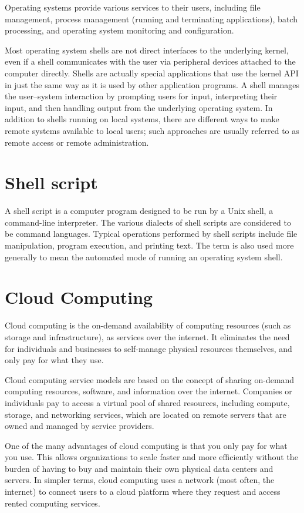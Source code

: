 	Operating systems provide various services to their users, including file management, process management (running and terminating applications), batch processing, and operating system monitoring and configuration.

	Most operating system shells are not direct interfaces to the underlying kernel, even if a shell communicates with the user via peripheral devices 
	attached to the computer directly. Shells are actually special applications that use the kernel API in just the same way as it is used by 
	other application programs. A shell manages the user–system interaction by prompting users for input, interpreting their input, and then 
	handling output from the underlying operating system. In addition to shells running on local systems, there are different ways to make remote 
	systems available to local users; such approaches are usually referred to as remote access or remote administration.

\section{Shell script}
	A shell script \cite{shellscript} is a computer program designed to be run by a Unix shell, a command-line interpreter. The various dialects of shell scripts 
	are considered to be command languages. Typical operations performed by shell scripts include file manipulation, program execution, and printing text.
	The term is also used more generally to mean the automated mode of running an operating system shell.

\section{Cloud Computing}
	Cloud computing \cite{cloud} is the on-demand availability of computing resources (such as storage and infrastructure), as services over the internet. 
	It eliminates the need for individuals and businesses to self-manage physical resources themselves, and only pay for what they use.

	Cloud computing service models are based on the concept of sharing on-demand computing resources, software, and information over the internet. 
	Companies or individuals pay to access a virtual pool of shared resources, including compute, storage, and networking services, which are located on
	remote servers that are owned and managed by service providers. 

	One of the many advantages of cloud computing is that you only pay for what you use. This allows organizations to scale faster and more efficiently 
	without the burden of having to buy and maintain their own physical data centers and servers.  
	In simpler terms, cloud computing uses a network (most often, the internet) to connect users to a cloud platform where they request and access 
	rented computing services.

